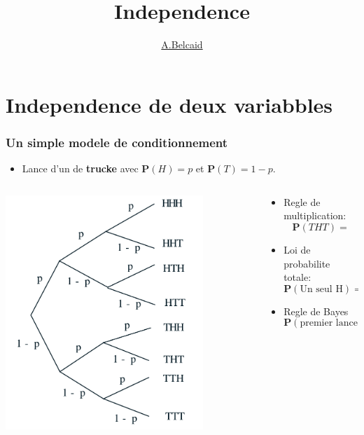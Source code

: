 \documentclass{beamer}
\title{Independence}
\author{\underline{A.Belcaid}}
\institute{\small ENSA-Safi}
\begin{document}
\maketitle

\begin{frame}
\tableofcontents
\end{frame}

\section{Independence de deux variabbles}

\begin{frame}[t]
  \frametitle{Un simple modele de conditionnement}
  \begin{itemize}
  \small
  \item Lance d'un de \textbf{trucke} avec $\mathbf{P}(H)=p$ et $\mathbf{P}(T)=
    1 - p$.
  \end{itemize}
 \begin{columns}
   \begin{column}{0.4\textwidth}
       \centering
       \includegraphics[width=0.8\textwidth]{example_tree_mdel.png}
   \end{column}
   \begin{column}{0.6\textwidth}
    \begin{itemize}
      \scriptsize
      \item Regle de multiplication:
        $$
        \mathbf{P}(THT) = 
        $$
      \item Loi de probabilite totale:
        $$
        \mathbf{P}(\text{Un seul H}) = 
        $$
      \item Regle de Bayes
        $$
        \mathbf{P}(\text{premier lance est H}\;|\;  \text{ 1 seul H}) = 
        $$

    \end{itemize} 
   \end{column}
 \end{columns} 
\end{frame}
\end{document}
